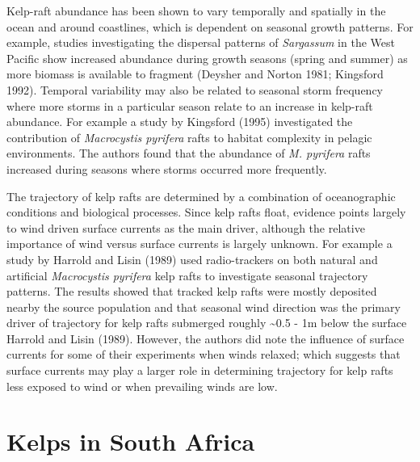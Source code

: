 \documentclass[
]{article}
\begin{document}
Kelp-raft abundance has been shown to vary temporally and spatially in
the ocean and around coastlines, which is dependent on seasonal growth
patterns. For example, studies investigating the dispersal patterns of
\emph{Sargassum} in the West Pacific show increased abundance during
growth seasons (spring and summer) as more biomass is available to
fragment (Deysher and Norton 1981; Kingsford 1992). Temporal variability
may also be related to seasonal storm frequency where more storms in a
particular season relate to an increase in kelp-raft abundance. For
example a study by Kingsford (1995) investigated the contribution of
\emph{Macrocystis pyrifera} rafts to habitat complexity in pelagic
environments. The authors found that the abundance of \emph{M. pyrifera}
rafts increased during seasons where storms occurred more frequently.

The trajectory of kelp rafts are determined by a combination of
oceanographic conditions and biological processes. Since kelp rafts
float, evidence points largely to wind driven surface currents as the
main driver, although the relative importance of wind versus surface
currents is largely unknown. For example a study by Harrold and Lisin
(1989) used radio-trackers on both natural and artificial
\emph{Macrocystis pyrifera} kelp rafts to investigate seasonal
trajectory patterns. The results showed that tracked kelp rafts were
mostly deposited nearby the source population and that seasonal wind
direction was the primary driver of trajectory for kelp rafts submerged
roughly \textasciitilde0.5 - 1m below the surface Harrold and Lisin
(1989). However, the authors did note the influence of surface currents
for some of their experiments when winds relaxed; which suggests that
surface currents may play a larger role in determining trajectory for
kelp rafts less exposed to wind or when prevailing winds are low.

\hypertarget{kelps-in-south-africa}{%
\section{Kelps in South Africa}\label{kelps-in-south-africa}}
\end{document}
